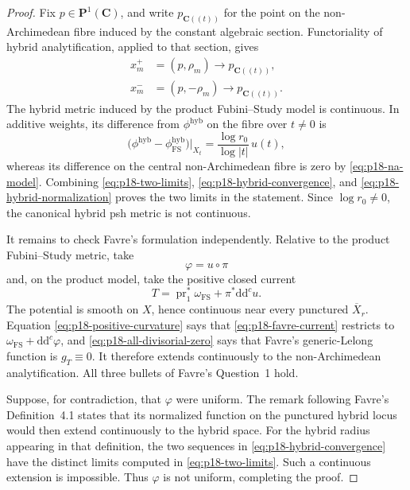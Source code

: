 \begin{proof}
Fix \(p\in\mathbf P^1(\mathbf C)\), and write \(p_{\mathbf C((t))}\)
for the point on the non-Archimedean fibre induced by the constant
algebraic section.  Functoriality of hybrid analytification, applied to
that section, gives
\[
\begin{aligned}
 x_m^+&=(p,\rho_m)\longrightarrow p_{\mathbf C((t))},\\
 x_m^-&=(p,-\rho_m)\longrightarrow p_{\mathbf C((t))}.
\end{aligned}
\tag{15}\label{eq:p18-hybrid-convergence}
\]
The hybrid metric induced by the product Fubini--Study model is
continuous.  In additive weights, its difference from
\(\phi^{\mathrm{hyb}}\) on the fibre over \(t\ne0\) is
\[
 \bigl(\phi^{\mathrm{hyb}}
       -\phi_{\mathrm{FS}}^{\mathrm{hyb}}\bigr)|_{X_t}
 =\frac{\log r_0}{\log|t|}\,u(t),
\tag{16}\label{eq:p18-hybrid-normalization}
\]
whereas its difference on the central non-Archimedean fibre is zero by
\eqref{eq:p18-na-model}.  Combining
\eqref{eq:p18-two-limits},
\eqref{eq:p18-hybrid-convergence}, and
\eqref{eq:p18-hybrid-normalization} proves the two limits in the
statement.  Since \(\log r_0\ne0\), the canonical hybrid psh metric is
not continuous.

It remains to check Favre's formulation independently.  Relative to the
product Fubini--Study metric, take
\[
                         \varphi=u\circ\pi
\]
and, on the product model, take the positive closed current
\[
 T=
 \operatorname{pr}_1^*\omega_{\mathrm{FS}}
 +\pi^*\mathrm d\mathrm d^c u.
\tag{17}\label{eq:p18-favre-current}
\]
The potential is smooth on \(X\), hence continuous near every punctured
\(\overline X_r\).  Equation \eqref{eq:p18-positive-curvature} says that
\eqref{eq:p18-favre-current} restricts to
\(\omega_{\mathrm{FS}}+\mathrm d\mathrm d^c\varphi\), and
\eqref{eq:p18-all-divisorial-zero} says that Favre's generic-Lelong
function is \(g_T\equiv0\).  It therefore extends continuously to the
non-Archimedean analytification.  All three bullets of Favre's
Question~1 hold.

Suppose, for contradiction, that \(\varphi\) were uniform.  The remark
following Favre's Definition~4.1 states that its normalized function on
the punctured hybrid locus would then extend continuously to the hybrid
space.  For the hybrid radius appearing in that definition, the two
sequences in \eqref{eq:p18-hybrid-convergence} have the distinct limits
computed in \eqref{eq:p18-two-limits}.  Such a continuous extension is
impossible.  Thus \(\varphi\) is not uniform, completing the proof.
\end{proof}
